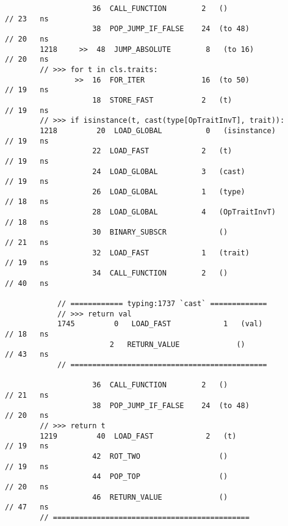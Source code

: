 \begin{code}
\begin{verbatim}
                    36  CALL_FUNCTION        2   ()                                         // 23   ns
                    38  POP_JUMP_IF_FALSE    24  (to 48)                                    // 20   ns
        1218     >>  48  JUMP_ABSOLUTE        8   (to 16)                                   // 20   ns
        // >>> for t in cls.traits:
                >>  16  FOR_ITER             16  (to 50)                                    // 19   ns
                    18  STORE_FAST           2   (t)                                        // 19   ns
        // >>> if isinstance(t, cast(type[OpTraitInvT], trait)):
        1218         20  LOAD_GLOBAL          0   (isinstance)                              // 19   ns
                    22  LOAD_FAST            2   (t)                                        // 19   ns
                    24  LOAD_GLOBAL          3   (cast)                                     // 19   ns
                    26  LOAD_GLOBAL          1   (type)                                     // 18   ns
                    28  LOAD_GLOBAL          4   (OpTraitInvT)                              // 18   ns
                    30  BINARY_SUBSCR            ()                                         // 21   ns
                    32  LOAD_FAST            1   (trait)                                    // 19   ns
                    34  CALL_FUNCTION        2   ()                                         // 40   ns

            // ============ typing:1737 `cast` =============
            // >>> return val
            1745         0   LOAD_FAST            1   (val)                                 // 18   ns
                        2   RETURN_VALUE             ()                                     // 43   ns
            // =============================================

                    36  CALL_FUNCTION        2   ()                                         // 21   ns
                    38  POP_JUMP_IF_FALSE    24  (to 48)                                    // 20   ns
        // >>> return t
        1219         40  LOAD_FAST            2   (t)                                       // 19   ns
                    42  ROT_TWO                  ()                                         // 19   ns
                    44  POP_TOP                  ()                                         // 20   ns
                    46  RETURN_VALUE             ()                                         // 47   ns
        // =============================================


\end{verbatim}
\end{code}
